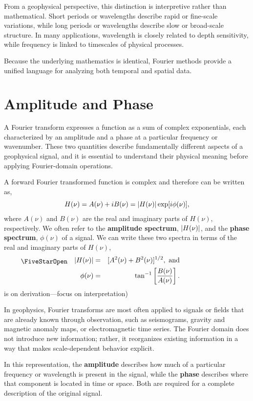 From a geophysical perspective, this distinction is interpretive rather than mathematical. Short periods or wavelengths describe rapid or fine-scale variations, while long periods or wavelengths describe slow or broad-scale structure. In many applications, wavelength is closely related to depth sensitivity, while frequency is linked to timescales of physical processes.

Because the underlying mathematics is identical, Fourier methods provide a unified language for analyzing both temporal and spatial data.

\section{Amplitude and Phase}

A Fourier transform expresses a function as a sum of complex exponentials, each characterized by an amplitude and a phase at a particular frequency or wavenumber. These two quantities describe fundamentally different aspects of a geophysical signal, and it is essential to understand their physical meaning before applying Fourier-domain operations.

A forward Fourier transformed function is complex and therefore can be written as,
\begin{equation}
    H(\nu) = A(\nu) + iB(\nu) = \abs{H(\nu)} \exp [ i \phi(\nu) ],
\end{equation}
where $A(\nu)$ and $B(\nu)$ are the real and imaginary parts of $H(\nu)$, respectively.  We often refer to the {\bf amplitude spectrum}, $\abs{H(\nu)}$, and the {\bf phase spectrum}, $\phi(\nu)$  of a signal.  We can write these two spectra in terms of the real and imaginary parts of $H(\nu)$,
\begin{eqnarray}
    \workeq
    \abs{H(\nu)} & = & [A^{2}(\nu) + B^{2}(\nu)]^{1/2}, \mbox{ and}\\
    \phi(\nu) & = & \tan^{-1}\left[\frac{B(\nu)}{A(\nu)} \right].
\end{eqnarray}is on derivation—focus on interpretation)

In geophysics, Fourier transforms are most often applied to signals or fields that are already known through observation, such as seismograms, gravity and magnetic anomaly maps, or electromagnetic time series. The Fourier domain does not introduce new information; rather, it reorganizes existing information in a way that makes scale-dependent behavior explicit.

In this representation, the \textbf{amplitude} describes how much of a particular frequency or wavelength is present in the signal, while the \textbf{phase} describes where that component is located in time or space. Both are required for a complete description of the original signal.

